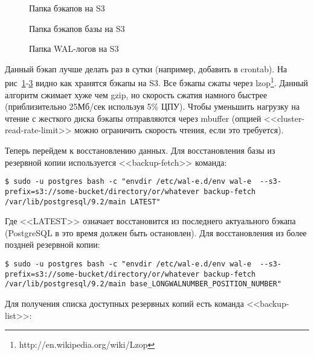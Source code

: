 \begin{figure}[h!]
  \caption{Папка бэкапов на S3}
  \label{fig:wal-e1}
\end{figure}

\begin{figure}[h!]
  \caption{Папка бэкапов базы на S3}
  \label{fig:wal-e2}
\end{figure}

\begin{figure}[h!]
  \caption{Папка WAL-логов на S3}
  \label{fig:wal-e3}
\end{figure}

Данный бэкап лучше делать раз в сутки (например, добавить в crontab). На рис~\ref{fig:wal-e1}-\ref{fig:wal-e3} видно как хранятся бэкапы на S3. Все бэкапы сжаты через lzop\footnote{http://en.wikipedia.org/wiki/Lzop}. Данный алгоритм сжимает хуже чем gzip, но скорость сжатия намного быстрее (приблизительно 25Мб/сек используя 5\% ЦПУ). Чтобы уменьшить нагрузку на чтение с жесткого диска бэкапы отправляются через mbuffer (опцией <<cluster-read-rate-limit>> можно ограничить скорость чтения, если это требуется).

Теперь перейдем к восстановлению данных. Для восстановления базы из резервной копии используется <<backup-fetch>> команда:

\begin{lstlisting}[label=lst:wal-e10,caption=Восстановление бэкапа базы из S3]
$ sudo -u postgres bash -c "envdir /etc/wal-e.d/env wal-e  --s3-prefix=s3://some-bucket/directory/or/whatever backup-fetch /var/lib/postgresql/9.2/main LATEST"
\end{lstlisting}

Где <<LATEST>> означает восстановится из последнего актуального бэкапа (PostgreSQL в это время должен быть остановлен). Для восстановления из более поздней резервной копии:

\begin{lstlisting}[label=lst:wal-e11,caption=Восстановление из поздней резервной копии]
$ sudo -u postgres bash -c "envdir /etc/wal-e.d/env wal-e  --s3-prefix=s3://some-bucket/directory/or/whatever backup-fetch /var/lib/postgresql/9.2/main base_LONGWALNUMBER_POSITION_NUMBER"
\end{lstlisting}

Для получения списка доступных резервных копий есть команда <<backup-list>>:


